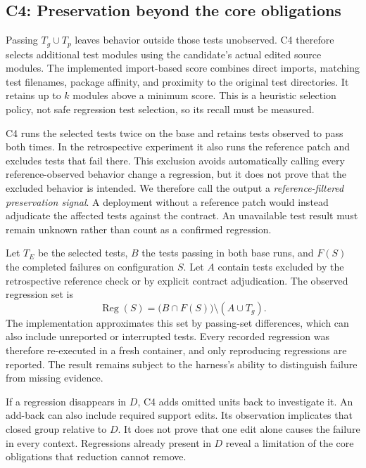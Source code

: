 \documentclass[a4paper,fleqn]{cas-sc}
\begin{document}
\subsection{C4: Preservation beyond the core obligations}\label{sec:envelope}

Passing $T_g\cup T_p$ leaves behavior outside those tests unobserved. C4 therefore selects additional test modules using the candidate's actual edited source modules. The implemented import-based score combines direct imports, matching test filenames, package affinity, and proximity to the original test directories. It retains up to $k$ modules above a minimum score. This is a heuristic selection policy, not safe regression test selection, so its recall must be measured.

C4 runs the selected tests twice on the base and retains tests observed to pass both times. In the retrospective experiment it also runs the reference patch and excludes tests that fail there. This exclusion avoids automatically calling every reference-observed behavior change a regression, but it does not prove that the excluded behavior is intended. We therefore call the output a \emph{reference-filtered preservation signal}. A deployment without a reference patch would instead adjudicate the affected tests against the contract. An unavailable test result must remain unknown rather than count as a confirmed regression.

Let $T_E$ be the selected tests, $B$ the tests passing in both base runs, and $F(S)$ the completed failures on configuration $S$. Let $A$ contain tests excluded by the retrospective reference check or by explicit contract adjudication. The observed regression set is
\begin{equation}
\operatorname{Reg}(S)=\bigl(B\cap F(S)\bigr)\setminus(A\cup T_g).
\label{eq:regression}
\end{equation}
The implementation approximates this set by passing-set differences, which can also include unreported or interrupted tests. Every recorded regression was therefore re-executed in a fresh container, and only reproducing regressions are reported. The result remains subject to the harness's ability to distinguish failure from missing evidence.

If a regression disappears in $D$, C4 adds omitted units back to investigate it. An add-back can also include required support edits. Its observation implicates that closed group relative to $D$. It does not prove that one edit alone causes the failure in every context. Regressions already present in $D$ reveal a limitation of the core obligations that reduction cannot remove.
\end{document}
